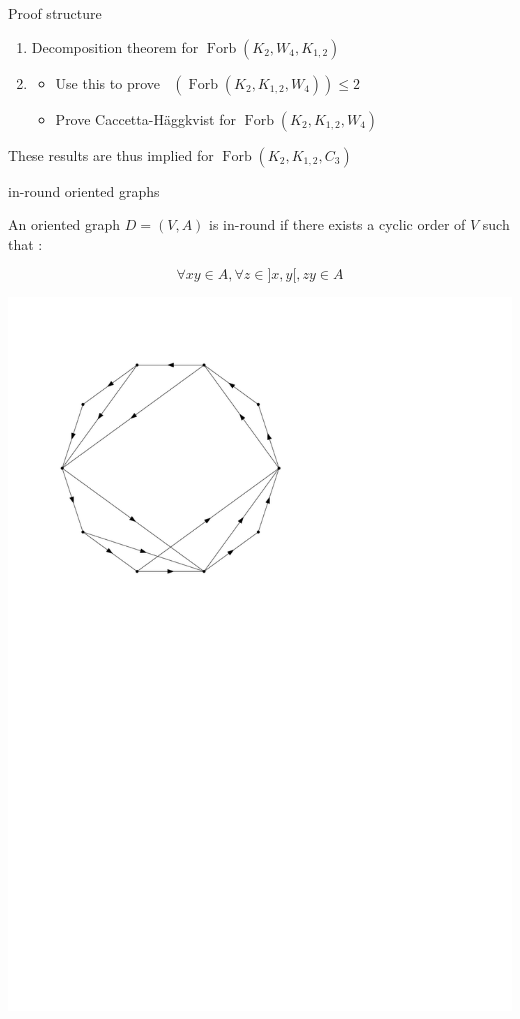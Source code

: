 \documentclass{beamer}
\newcommand{\Hag}{H\"aggkvist\xspace}
\newcommand{\ora}[1]{\overrightarrow{#1}}
\DeclareMathOperator{\dic}{\ora \chi}
\DeclareMathOperator{\Forb}{Forb}
\newcommand{\F}[1]{\Forb{#1}}
\begin{document}
\begin{frame}{Proof structure}
\begin{enumerate}
    \item Decomposition theorem for $\F{(K_2,W_4,K_{1,2})}$
    \item \begin{itemize}
            \item Use this to prove $\dic(\F{(K_2,K_{1,2},W_4)}) \leq 2$
            \item Prove Caccetta-\Hag for $\F{(K_2,K_{1,2},W_4)}$
          \end{itemize}
\end{enumerate}

These results are thus implied for $\F{(K_2,K_{1,2},C_3)}$
\end{frame}

\begin{frame}{in-round oriented graphs}
\begin{definition}
An oriented graph $D=(V,A)$ is in-round if there exists a cyclic order of $V$ such that :

$$\forall xy\in A, \forall z\in ]x,y[, zy\in A$$
\end{definition}

\centering

\includegraphics[scale=0.5]{Images/inround.pdf}
\end{frame}
\end{document}
